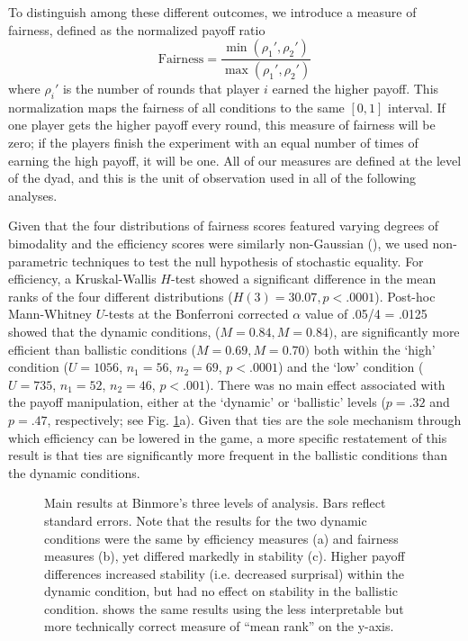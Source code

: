 \documentclass[10pt,letterpaper]{article}
\begin{document}
To distinguish among these different outcomes, we introduce a measure of fairness, defined as the normalized payoff ratio $$\text{Fairness} = \frac{\min(\rho_1', \rho_2')}{\max(\rho_1', \rho_2')}$$ where $\rho_i'$ is the number of rounds that player $i$ earned the higher payoff. This normalization maps the fairness of all conditions to the same $[0,1]$ interval. If one player gets the higher payoff every round, this measure of fairness will be zero; if the players finish the experiment with an equal number of times of earning the high payoff, it will be one. All of our measures are defined at the level of the dyad, and this is the unit of observation used in all of the following analyses. 

Given that the four distributions of fairness scores featured varying degrees of bimodality and the efficiency scores were similarly non-Gaussian (), we used non-parametric techniques to test the null hypothesis of stochastic equality. For efficiency, a Kruskal-Wallis $H$-test showed a significant difference in the mean ranks of the four different distributions ($H(3) = 30.07, p < .0001$). Post-hoc Mann-Whitney $U$-tests at the Bonferroni corrected $\alpha$ value of .05/4 = .0125 showed that the dynamic conditions, ($M = 0.84, M = 0.84)$, are significantly more efficient than ballistic conditions ($M = 0.69, M = 0.70)$ both within the `high' condition ($U = 1056$, $n_1 = 56$, $n_2 = 69$, $p < .0001$) and the `low' condition ($U = 735$, $n_1 = 52$, $n_2 = 46$, $p < .001$). There was no main effect associated with the payoff manipulation, either at the `dynamic' or `ballistic' levels ($p = .32$ and $p = .47$, respectively; see Fig. \ref{Fig2}a). Given that ties are the sole mechanism through which efficiency can be lowered in the game, a more specific restatement of this result is that ties are significantly more frequent in the ballistic conditions than the dynamic conditions.

\begin{figure}[t!]
\centering
\caption{Main results at Binmore's three levels of analysis. Bars reflect standard errors. Note that the results for the two dynamic conditions were the same by efficiency measures (a) and fairness measures (b), yet differed markedly in stability (c). Higher payoff differences increased stability (i.e. decreased surprisal) within the dynamic condition, but had no effect on stability in the ballistic condition.  shows the same results using the less interpretable but more technically correct measure of ``mean rank'' on the y-axis.}
\label{Fig2}
\end{figure}
\end{document}
